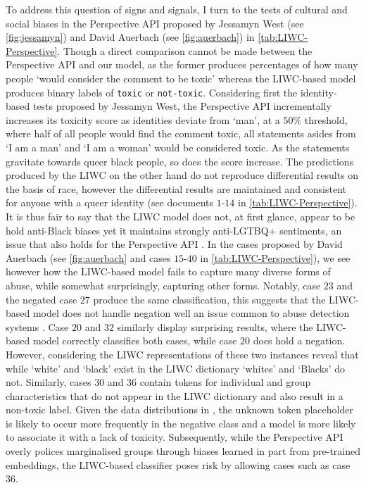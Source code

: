 To address this question of signs and signals, I turn to the tests of cultural and social biases in the Perspective API proposed by Jessamyn West (see \autoref{fig:jessamyn}) and David Auerbach (see \autoref{fig:auerbach}) in \autoref{tab:LIWC-Perspective}. Though a direct comparison cannot be made between the Perspective API and our model, as the former produces percentages of how many people `would consider the comment to be toxic' \citep{PerspectiveAPI:Github} whereas the LIWC-based model produces binary labels of \texttt{toxic} or \texttt{not-toxic}. Considering first the identity-based tests proposed by Jessamyn West, the Perspective API incrementally increases its toxicity score as identities deviate from `man', at a $50\%$ threshold, where half of all people would find the comment toxic, all statements asides from `I am a man' and `I am a woman' would be considered toxic. As the statements gravitate towards queer black people, so does the score increase. The predictions produced by the LIWC on the other hand do not reproduce differential results on the basis of race, however the differential results are maintained and consistent for anyone with a queer identity (see documents $1$-$14$ in \autoref{tab:LIWC-Perspective}). It is thus fair to say that the LIWC model does not, at first glance, appear to be hold anti-Black biases yet it maintains strongly anti-LGTBQ+ sentiments, an issue that also holds for the Perspective API \citep{Oliva:2020}. In the cases proposed by David Auerbach (see \autoref{fig:auerbach} and cases $15$-$40$ in \autoref{tab:LIWC-Perspective}), we see however how the LIWC-based model fails to capture many diverse forms of abuse, while somewhat surprisingly, capturing other forms. Notably, case $23$ and the negated case $27$ produce the same classification, this suggests that the LIWC-based model does not handle negation well an issue common to abuse detection systems \cite{Rottger:2021}. Case $20$ and $32$ similarly display surprising results, where the LIWC-based model correctly classifies both cases, while case $20$ does hold a negation. However, considering the LIWC representations of these two instances reveal that while `white' and `black' exist in the LIWC dictionary `whites' and `Blacks' do not. Similarly, cases $30$ and $36$ contain tokens for individual and group characteristics that do not appear in the LIWC dictionary and also result in a non-toxic label. Given the data distributions in \citet{Wulczyn:2017}, the unknown token placeholder is likely to occur more frequently in the negative class and a model is more likely to associate it with a lack of toxicity. Subsequently, while the Perspective API overly polices marginalised groups through biases learned in part from pre-trained embeddings, the LIWC-based classifier poses risk by allowing cases such as case $36$. 
\vspace{5mm}


